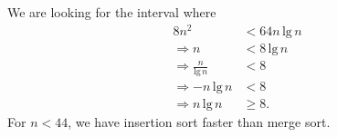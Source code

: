 
We are looking for the interval where
\begin{equation*}
    \begin{aligned}
        8n^2 &< 64n\, \text{lg}\, n\\
        \Rightarrow n &< 8\, \text{lg}\, n\\
        \Rightarrow \frac{n}{\text{lg}\, n} &< 8\\
        \Rightarrow -n \, \text{lg}\, n &< 8\\
        \Rightarrow n \, \text{lg}\, n &\geq 8.
    \end{aligned}
\end{equation*}
For $n < 44$, we have insertion sort faster than merge sort.
